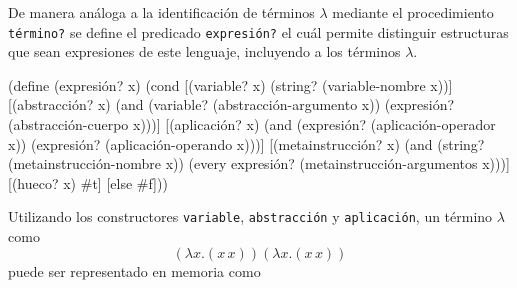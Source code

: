\eatline
{}\nwendcode{}\nwdocspar


De manera análoga a la identificación de términos \( λ \) mediante el procedimiento {\tt{}\protect{}término?} se define el predicado {\tt{}\protect{}expresión?} el cuál permite distinguir estructuras que sean expresiones de este lenguaje, incluyendo a los términos \( λ \).

\nwenddocs{}\plusendmoddef
(define (expresión? x)
  (cond
   [(variable? x)        (string? (variable-nombre x))]
   [(abstracción? x)     (and (variable? (abstracción-argumento x))
                              (expresión? (abstracción-cuerpo x)))]
   [(aplicación? x)      (and (expresión? (aplicación-operador x))
                              (expresión? (aplicación-operando x)))]
   [(metainstrucción? x) (and (string? (metainstrucción-nombre x))
                              (every expresión? (metainstrucción-argumentos x)))]
   [(hueco? x)           #t]
   [else                 #f]))

\eatline
{}\nwendcode{}\nwdocspar

Utilizando los constructores {\tt{}\protect{}variable}, {\tt{}\protect{}abstracción} y {\tt{}\protect{}aplicación}, un término \( λ \) como
\[ (λx.(x\, x)) (λx.(x\, x)) \]
puede ser representado en memoria como


